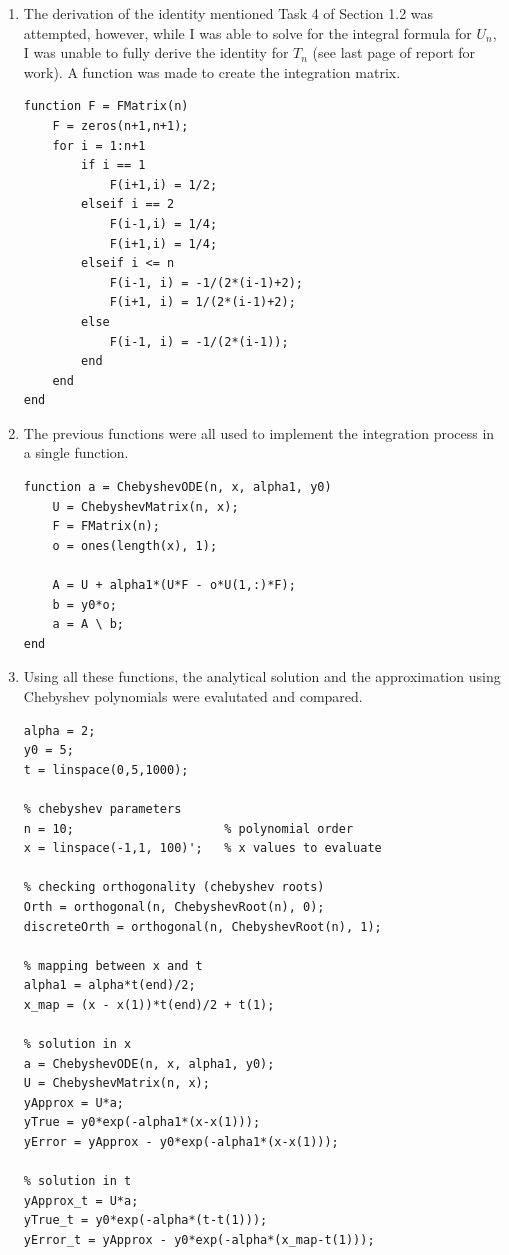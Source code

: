 \documentclass{article}
\begin{document}
\begin{enumerate}
\item The derivation of the identity mentioned Task 4 of Section 1.2 was attempted, however, while I was able to solve for the integral formula for $U_n$, I was unable to fully derive the identity for $T_n$ (see last page of report for work). A function was made to create the integration matrix.
    \begin{lstlisting}[style=Matlab-editor]
function F = FMatrix(n)
    F = zeros(n+1,n+1);
    for i = 1:n+1
        if i == 1
            F(i+1,i) = 1/2;
        elseif i == 2
            F(i-1,i) = 1/4;
            F(i+1,i) = 1/4;
        elseif i <= n
            F(i-1, i) = -1/(2*(i-1)+2);
            F(i+1, i) = 1/(2*(i-1)+2);
        else
            F(i-1, i) = -1/(2*(i-1));
        end
    end
end
    \end{lstlisting}

\item The previous functions were all used to implement the integration process in a single function. 

    \begin{lstlisting}[style=Matlab-editor]
function a = ChebyshevODE(n, x, alpha1, y0)
    U = ChebyshevMatrix(n, x);
    F = FMatrix(n);
    o = ones(length(x), 1);
  
    A = U + alpha1*(U*F - o*U(1,:)*F);
    b = y0*o;
    a = A \ b;
end
    \end{lstlisting}

\item Using all these functions, the analytical solution and the approximation using Chebyshev polynomials were evalutated and compared. 

\begin{lstlisting}[style=Matlab-editor]
% let dy/dt = y, y(0) = 1, 0 <= t <= 5
alpha = 2;
y0 = 5;
t = linspace(0,5,1000);

% chebyshev parameters
n = 10;                     % polynomial order
x = linspace(-1,1, 100)';   % x values to evaluate

% checking orthogonality (chebyshev roots)
Orth = orthogonal(n, ChebyshevRoot(n), 0);
discreteOrth = orthogonal(n, ChebyshevRoot(n), 1);

% mapping between x and t
alpha1 = alpha*t(end)/2;
x_map = (x - x(1))*t(end)/2 + t(1);

% solution in x
a = ChebyshevODE(n, x, alpha1, y0);
U = ChebyshevMatrix(n, x);
yApprox = U*a;
yTrue = y0*exp(-alpha1*(x-x(1)));
yError = yApprox - y0*exp(-alpha1*(x-x(1)));

% solution in t
yApprox_t = U*a;
yTrue_t = y0*exp(-alpha*(t-t(1)));
yError_t = yApprox - y0*exp(-alpha*(x_map-t(1)));
    \end{lstlisting}

\end{enumerate}
\end{document}
